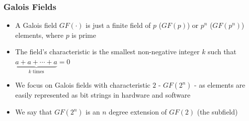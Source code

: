\documentclass[handout,10pt]{beamer}
\begin{document}





\begin{frame}
	\frametitle{Galois Fields}
	\begin{itemize}
		\item A Galois field $GF(\cdot)$ is just a finite field of $p$ ($GF(p)$) or $p^n$ ($GF(p^n)$) elements, where $p$ is prime
		\item The field's characteristic is the smallest non-negative integer $k$ such that $\underbrace{a + a + \dotsb + a}_{k \text{ times}} = 0$
		\item We focus on Galois fields with characteristic $2$ - $GF(2^n)$ - as elements are easily represented as bit strings in hardware and software
		\item We say that $GF(2^n)$ is an $n$ degree extension of $GF(2)$ (the subfield)
	\end{itemize}
\end{frame}
\end{document}
